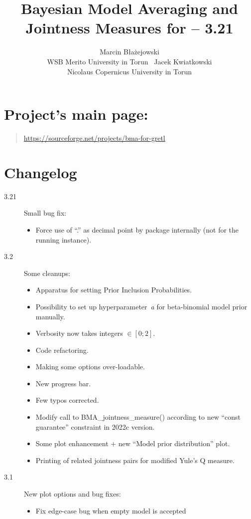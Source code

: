 \documentclass[article]{repec}
\author{Marcin Błażejowski\\WSB Merito University in Torun\ \And
        Jacek Kwiatkowski\\Nicolaus Copernicus University in Torun}
\title{Bayesian Model Averaging and Jointness Measures for \gretl -- 3.21}
\begin{document}
	
\section*{Project's main page:}
\begin{quote}
	\centering
	\url{https://sourceforge.net/projects/bma-for-gretl}
\end{quote}


\section*{Changelog}
{\small\begin{description}
	\item[3.21] Small bug fix:
		\begin{itemize}
			\item Force use of ``.'' as decimal point by \BMA package
				internally (not for the running \gretl instance).
		\end{itemize}
	\item[3.2] Some cleanups:
		\begin{itemize}
			\item Apparatus for setting Prior Inclusion
				Probabilities.
			\item Possibility to set up hyperparameter~\textit{a}
				for beta-binomial model prior manually.
			\item Verbosity now takes integers $\in [0;2]$.
			\item Code refactoring.
			\item Making some options over-loadable.
			\item New progress bar.
			\item Few typos corrected.
			\item Modify call to BMA\_jointness\_measure() according
				to new ``const guarantee'' constraint in 2022c version.
			\item Some plot enhancement + new ``Model prior distribution'' plot.
			\item Printing of related jointness pairs for modified Yule's Q
				measure.
		\end{itemize}
	\item[3.1] New plot options and bug fixes:
		\begin{itemize}
			\item Fix edge-case bug when empty model is accepted

\end{itemize}
\end{description}}
\end{document}
